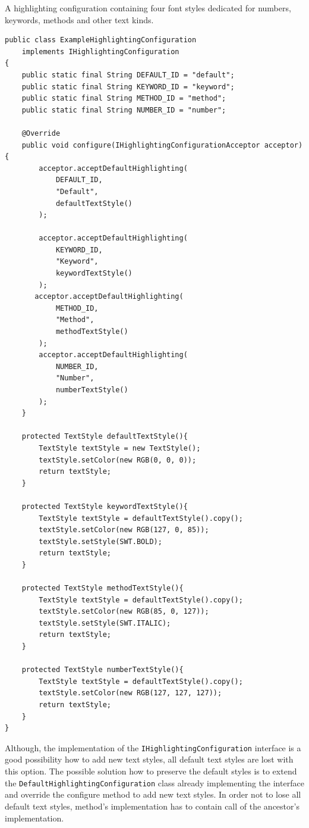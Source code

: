 \documentclass[12pt,notitlepage,a4paper]{report}
\begin{document}
\begin{expl}
\label{HighlightingConfigurationExample}
A highlighting configuration containing four font styles dedicated for numbers, keywords, methods and other text kinds.
\begingroup
\fontsize{10pt}{12pt}
\begin{verbatim}
public class ExampleHighlightingConfiguration
    implements IHighlightingConfiguration
{
    public static final String DEFAULT_ID = "default";
    public static final String KEYWORD_ID = "keyword";
    public static final String METHOD_ID = "method";
    public static final String NUMBER_ID = "number";

    @Override
    public void configure(IHighlightingConfigurationAcceptor acceptor){
        acceptor.acceptDefaultHighlighting(
            DEFAULT_ID,
            "Default",
            defaultTextStyle()
        );

        acceptor.acceptDefaultHighlighting(
            KEYWORD_ID,
            "Keyword",
            keywordTextStyle()
        );
       acceptor.acceptDefaultHighlighting(
            METHOD_ID,
            "Method",
            methodTextStyle()
        );
        acceptor.acceptDefaultHighlighting(
            NUMBER_ID,
            "Number",
            numberTextStyle()
        );
    }
	
    protected TextStyle defaultTextStyle(){
        TextStyle textStyle = new TextStyle();
        textStyle.setColor(new RGB(0, 0, 0));
        return textStyle;
    }

    protected TextStyle keywordTextStyle(){
        TextStyle textStyle = defaultTextStyle().copy();
        textStyle.setColor(new RGB(127, 0, 85));
        textStyle.setStyle(SWT.BOLD);
        return textStyle;
    }

    protected TextStyle methodTextStyle(){
        TextStyle textStyle = defaultTextStyle().copy();
        textStyle.setColor(new RGB(85, 0, 127));
        textStyle.setStyle(SWT.ITALIC);
        return textStyle;
    }
	
    protected TextStyle numberTextStyle(){
        TextStyle textStyle = defaultTextStyle().copy();
        textStyle.setColor(new RGB(127, 127, 127));
        return textStyle;
    } 
}
\end{verbatim}
\endgroup
\end{expl}

Although, the implementation of the \texttt{IHighlightingConfiguration} interface is a good possibility how to add new text styles, all default text styles are lost with this option. The possible solution how to preserve the default styles is to extend the \texttt{DefaultHighlightingConfiguration} class already implementing the interface and override the configure method to add new text styles. In order not to lose all default text styles,  method's implementation has to contain call of the ancestor's implementation.
\end{document}
